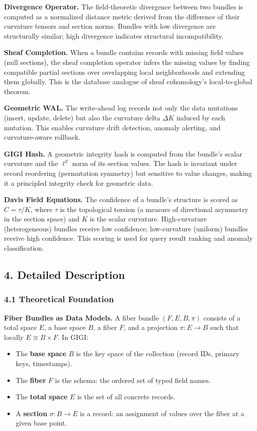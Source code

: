 \documentclass[11pt,letterpaper]{article}
\begin{document}
\textbf{Divergence Operator.} The field-theoretic divergence between two bundles is computed as a normalized distance metric derived from the difference of their curvature tensors and section norms. Bundles with low divergence are structurally similar; high divergence indicates structural incompatibility.

\textbf{Sheaf Completion.} When a bundle contains records with missing field values (null sections), the sheaf completion operator infers the missing values by finding compatible partial sections over overlapping local neighborhoods and extending them globally. This is the database analogue of sheaf cohomology's local-to-global theorem.

\textbf{Geometric WAL.} The write-ahead log records not only the data mutations (insert, update, delete) but also the curvature delta $\Delta K$ induced by each mutation. This enables curvature drift detection, anomaly alerting, and curvature-aware rollback.

\textbf{GIGI Hash.} A geometric integrity hash is computed from the bundle's scalar curvature and the $\ell^2$ norm of its section values. The hash is invariant under record reordering (permutation symmetry) but sensitive to value changes, making it a principled integrity check for geometric data.

\textbf{Davis Field Equations.} The confidence of a bundle's structure is scored as $C = \tau / K$, where $\tau$ is the topological torsion (a measure of directional asymmetry in the section space) and $K$ is the scalar curvature. High-curvature (heterogeneous) bundles receive low confidence; low-curvature (uniform) bundles receive high confidence. This scoring is used for query result ranking and anomaly classification.


\subsection*{4. Detailed Description}

\subsubsection*{4.1 Theoretical Foundation}

\textbf{Fiber Bundles as Data Models.} A fiber bundle $(F, E, B, \pi)$ consists of a total space $E$, a base space $B$, a fiber $F$, and a projection $\pi: E \to B$ such that locally $E \cong B \times F$. In GIGI:
\begin{itemize}[nosep]
  \item The \textbf{base space} $B$ is the key space of the collection (record IDs, primary keys, timestamps).
  \item The \textbf{fiber} $F$ is the schema: the ordered set of typed field names.
  \item The \textbf{total space} $E$ is the set of all concrete records.
  \item A \textbf{section} $\sigma: B \to E$ is a record: an assignment of values over the fiber at a given base point.
\end{itemize}
\end{document}
